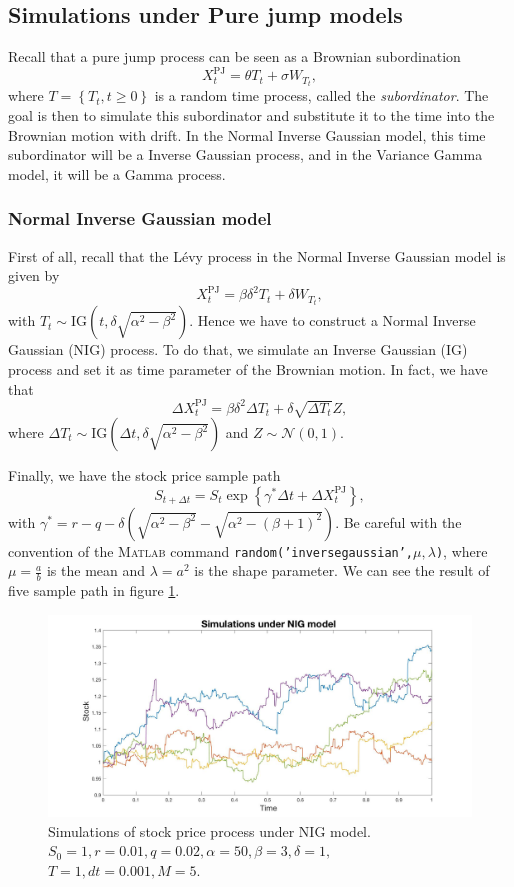 \subsection{Simulations under Pure jump models}
Recall that a pure jump process can be seen as a Brownian subordination
$$X_t^\text{PJ} = \theta T_t + \sigma W_{T_t},$$
where $T=\left\{T_t,t\geq0\right\}$ is a random time process, called the \textit{subordinator}. The goal is then to simulate this subordinator and substitute it to the time into the Brownian motion with drift. In the Normal Inverse Gaussian model, this time subordinator will be a Inverse Gaussian process, and in the Variance Gamma model, it will be a Gamma process.

\subsubsection{Normal Inverse Gaussian model}
First of all, recall that the L\'evy process in the Normal Inverse Gaussian model is given by
$$X_t^\text{PJ} = \beta \delta^2 T_t + \delta W_{T_t},$$
with $T_t\sim \text{IG}\left(t,\delta \sqrt{\alpha^2-\beta^2}\right)$.
Hence we have to construct a Normal Inverse Gaussian (NIG) process. To do that, we simulate an Inverse Gaussian (IG) process and set it as time parameter of the Brownian motion. In fact, we have that
$$\Delta X_t^\text{PJ} = \beta\delta^2\Delta T_t+\delta \sqrt{\Delta T_t}Z, $$
where $\Delta T_t\sim\text{IG}\left(\Delta t, \delta \sqrt{\alpha^2-\beta^2}\right)$ and $Z\sim\mathcal{N}(0,1)$.

Finally, we have the stock price sample path
$$S_{t+\Delta t}=S_t\exp\left\{\gamma^\ast\Delta t + \Delta X_t^\text{PJ}\right\},$$
with $\gamma^\ast=r-q -\delta \left(\sqrt{\alpha^2-\beta^2}-\sqrt{\alpha^2-(\beta+1)^2}\right)$.
Be careful with the convention of the \textsc{Matlab} command \texttt{random('inversegaussian',$\mu,\lambda$)}, where $\mu = \frac{a}{b}$ is the mean and $\lambda = a^2$ is the shape parameter. We can see the result of five sample path in figure \ref{fig:MC:NIG}.
\begin{figure}[!htb]
	\includegraphics[width=\textwidth]{gfx/NIG_plot}
	\caption{Simulations of stock price process under NIG model.\\ $S_0=1, r= 0.01,q = 0.02,\alpha = 50 , \beta = 3, \delta = 1,$\\$T = 1, dt = 0.001, M=5$.}
	\label{fig:MC:NIG}
\end{figure}
